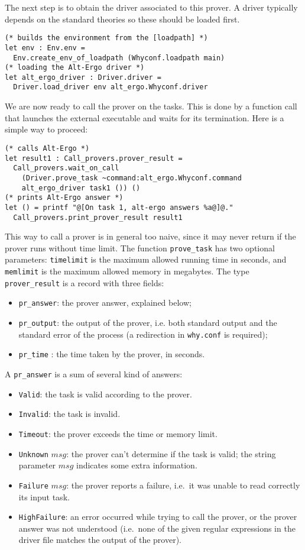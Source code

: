 The next step is to obtain the driver associated to this prover. A
driver typically depends on the standard theories so these should be
loaded first.
\begin{verbatim}
(* builds the environment from the [loadpath] *)
let env : Env.env =
  Env.create_env_of_loadpath (Whyconf.loadpath main)
(* loading the Alt-Ergo driver *)
let alt_ergo_driver : Driver.driver =
  Driver.load_driver env alt_ergo.Whyconf.driver
\end{verbatim}

We are now ready to call the prover on the tasks. This is done by a
function call that launches the external executable and waits for its
termination. Here is a simple way to proceed:
\begin{verbatim}
(* calls Alt-Ergo *)
let result1 : Call_provers.prover_result =
  Call_provers.wait_on_call
    (Driver.prove_task ~command:alt_ergo.Whyconf.command
    alt_ergo_driver task1 ()) ()
(* prints Alt-Ergo answer *)
let () = printf "@[On task 1, alt-ergo answers %a@]@."
  Call_provers.print_prover_result result1
\end{verbatim}
This way to call a prover is in general too naive, since it may never
return if the prover runs without time limit. The function
\texttt{prove\_task} has two optional parameters: \texttt{timelimit}
is the maximum allowed running time in seconds, and \texttt{memlimit}
is the maximum allowed memory in megabytes.  The type
\texttt{prover\_result} is a record with three fields:
\begin{itemize}
\item \texttt{pr\_answer}: the prover answer, explained below;
\item \texttt{pr\_output}: the output of the prover, i.e. both
  standard output and the standard error of the process
  (a redirection in \texttt{why.conf} is required);
\item \texttt{pr\_time} : the time taken by the prover, in seconds.
\end{itemize}
A \texttt{pr\_answer} is a sum of several kind of answers:
\begin{itemize}
\item \texttt{Valid}: the task is valid according to the prover.
\item \texttt{Invalid}: the task is invalid.
\item \texttt{Timeout}: the prover exceeds the time or memory limit.
\item \texttt{Unknown} $msg$: the prover can't determine if the task
  is valid; the string parameter $msg$ indicates some extra
  information.
\item \texttt{Failure} $msg$: the prover reports a failure, i.e.~it
  was unable to read correctly its input task.
\item \texttt{HighFailure}: an error occurred while trying to call the
  prover, or the prover answer was not understood (i.e.~none of the
  given regular expressions in the driver file matches the output
  of the prover).
\end{itemize}
